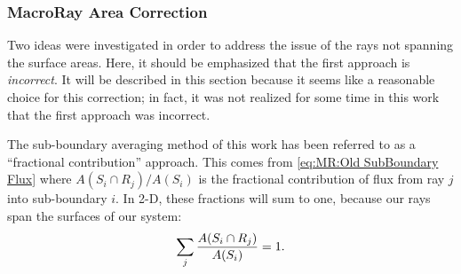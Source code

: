 {{{      \subsubsection{MacroRay Area Correction}{\label{sssec:MR:MacroRay Area Correction}
        Two ideas were investigated in order to address the issue of the rays not spanning the surface areas.
        Here, it should be emphasized that the first approach is \emph{incorrect}.
        It will be described in this section because it seems like a reasonable choice for this correction; in fact, it was not realized for some time in this work that the first approach was incorrect.

        The sub-boundary averaging method of this work has been referred to as a ``fractional contribution'' approach.
        This comes from \cref{eq:MR:Old SubBoundary Flux} where $A(S_i \cap R_j) / A(S_i)$ is the fractional contribution of flux from ray $j$ into sub-boundary $i$.
        In 2-D, these fractions will sum to one, because our rays span the surfaces of our system:
        \begin{equation}\label{eq:MR:2-D Fractional Unity}
          \suml[j] \frac{A(S_i \cap R_j)}{A(S_i)} = 1.
        \end{equation}

}}}}
